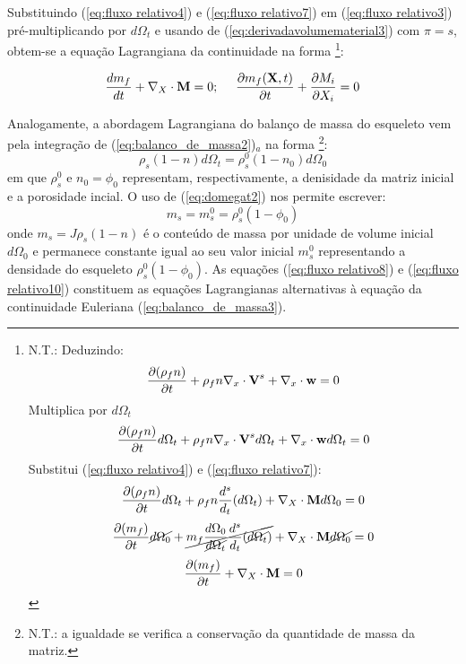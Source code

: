 \documentclass[
	11pt, %
	fleqn, %
	a4paper, %
]{LegrandOrangeBook}
\begin{document}
Substituindo (\ref{eq:fluxo relativo4}) e (\ref{eq:fluxo relativo7}) em (\ref{eq:fluxo relativo3}) pré-multiplicando por $d\Omega_t$ e usando de (\ref{eq:derivadavolumematerial3}) com $\pi = s$, obtem-se a equação Lagrangiana da continuidade na forma \footnote{N.T.: Deduzindo:
\begin{displaymath}	
	\dfrac{\partial (\rho_fn)}{\partial t}+\rho_fn \nabla_x \cdot \textbf{V}^s + \nabla_x \cdot \textbf{w} = 0
\end{displaymath}
Multiplica por $d\Omega_t$
\begin{displaymath}	
	\dfrac{\partial (\rho_fn)}{\partial t}d\Omega_t+\rho_fn \nabla_x \cdot \textbf{V}^s d\Omega_t + \nabla_x \cdot \textbf{w} d\Omega_t = 0
\end{displaymath}
Substitui (\ref{eq:fluxo relativo4}) e (\ref{eq:fluxo relativo7}):
\begin{displaymath}	
	\dfrac{\partial (\rho_fn)}{\partial t}d\Omega_t+\rho_fn \dfrac{d^s}{d_t}(d\Omega_t) + \nabla_X \cdot \textbf{M} d\Omega_0 = 0
\end{displaymath}
\begin{displaymath}	
	\dfrac{\partial (m_f)}{\partial t}\cancel{d\Omega_0}+\cancel{m_f\dfrac{d\Omega_0}{\cancel{d\Omega_t}} \dfrac{d^s}{d_t}(\cancel{d\Omega_t})} + \nabla_X \cdot \textbf{M} \cancel{d\Omega_0} = 0
\end{displaymath}
\begin{displaymath}	
	\dfrac{\partial (m_f)}{\partial t} + \nabla_X \cdot \textbf{M} = 0
\end{displaymath}

}:

\begin{equation}
	\label{eq:fluxo relativo8}	
	\dfrac{dm_f}{dt} + \nabla_X \cdot \textbf{M} = 0; ~~~~ \dfrac{\partial m_f(\textbf{X},t)}{\partial t} + \dfrac{\partial M_i}{\partial X_i} = 0
\end{equation}

Analogamente, a abordagem Lagrangiana do balanço de massa do esqueleto vem pela integração de (\ref{eq:balanco_de_massa2})$_a$ na forma \footnote{N.T.: a igualdade se verifica a conservação da quantidade de massa da matriz.}:
\begin{equation}
	\label{eq:fluxo relativo9}	
	\rho_s(1-n)d\Omega_t = \rho_s^0(1-n_0)d\Omega_0
\end{equation}
em que $\rho_s^0$ e $n_0 = \phi_0$ representam, respectivamente, a denisidade da matriz inicial e a porosidade incial. O uso de (\ref{eq:domegat2}) nos permite escrever:
\begin{equation}
	\label{eq:fluxo relativo10}	
	m_s = m_s^0 = \rho_s^0(1-\phi_0)
\end{equation}
onde $m_s = J\rho_s(1-n)$ é o conteúdo de massa por unidade de volume inicial $d\Omega_0$ e permanece constante igual ao seu valor inicial $m_s^0$ representando a densidade do esqueleto $\rho_s^0(1-\phi_0)$. As equações (\ref{eq:fluxo relativo8}) e (\ref{eq:fluxo relativo10}) constituem as equações Lagrangianas alternativas à  equação da continuidade Euleriana (\ref{eq:balanco_de_massa3}).
\end{document}
